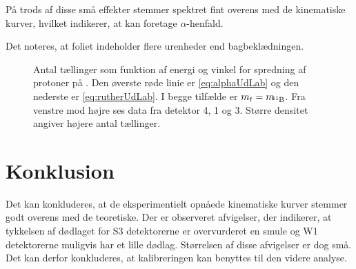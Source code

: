 På trods af disse små effekter stemmer spektret fint overens med de kinematiske kurver, hvilket
indikerer, at \Carb* kan foretage $\alpha$-henfald.

Det noteres, at \Bor foliet indeholder flere urenheder end bagbeklædningen. 
\begin{figure}[ht]
  \centering
  \hfill
  \caption{Antal tællinger som funktion af energi og vinkel for spredning af protoner på \Be. Den
    øverste røde linie er \cref{eq:alphaUdLab} og den nederste er \cref{eq:rutherUdLab}. I begge
    tilfælde er $m_{t} = m_{\!\!\Bor}$. Fra venstre mod højre ses
    data fra detektor 4, 1 og 3. Større densitet angiver højere antal tællinger.}
  \label{fig:1077}
\end{figure}

\section{Konklusion}
\label{sec:ruther-konklusion}
Det kan konkluderes, at de eksperimentielt opnåede kinematiske kurver stemmer godt overens med de
teoretiske. Der er observeret afvigelser, der indikerer, at tykkelsen af dødlaget for S3
detektorerne er overvurderet en smule og W1 detektorerne muligvis har et lille dødlag. Størrelsen af
disse afvigelser er dog små. Det kan derfor konkluderes, at kalibreringen kan benyttes til den
videre analyse.







